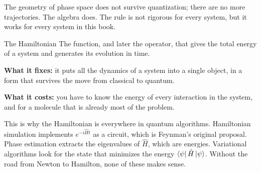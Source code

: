 The geometry of phase space does not survive quantization; there are no more
trajectories. The algebra does. The rule is not rigorous for every system, but it
works for every system in this book.

\begin{concept}{The Hamiltonian}
The function, and later the operator, that gives the total energy of a system and
generates its evolution in time.

\textbf{What it fixes:} it puts all the dynamics of a system into a single object,
in a form that survives the move from classical to quantum.

\textbf{What it costs:} you have to know the energy of every interaction in the
system, and for a molecule that is already most of the problem.
\end{concept}

This is why the Hamiltonian is everywhere in quantum algorithms. Hamiltonian
simulation implements $e^{-i\hat H t}$ as a circuit, which is Feynman's original
proposal. Phase estimation extracts the eigenvalues of $\hat H$, which are energies.
Variational algorithms look for the state that minimizes the energy
$\bra{\psi}\hat H\ket{\psi}$. Without the road from Newton to Hamilton, none of
these makes sense.
